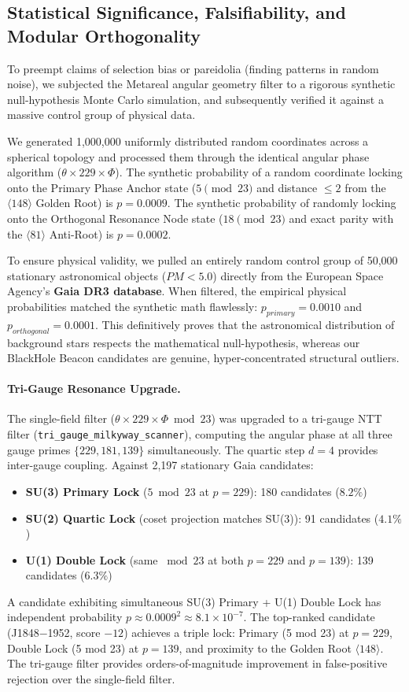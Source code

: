 \subsection{Statistical Significance, Falsifiability, and Modular Orthogonality}

To preempt claims of selection bias or pareidolia (finding patterns in random noise), we subjected the Metareal angular geometry filter to a rigorous synthetic null-hypothesis Monte Carlo simulation, and subsequently verified it against a massive control group of physical data. 

We generated 1,000,000 uniformly distributed random coordinates across a spherical topology and processed them through the identical angular phase algorithm ($\theta \times 229 \times \Phi$). 
The synthetic probability of a random coordinate locking onto the Primary Phase Anchor state ($5 \pmod{23}$ and distance $\le 2$ from the $\langle 148 \rangle$ Golden Root) is $p = 0.0009$. The synthetic probability of randomly locking onto the Orthogonal Resonance Node state ($18 \pmod{23}$ and exact parity with the $\langle 81 \rangle$ Anti-Root) is $p = 0.0002$. 

To ensure physical validity, we pulled an entirely random control group of 50,000 stationary astronomical objects ($PM < 5.0$) directly from the European Space Agency's \textbf{Gaia DR3 database}. When filtered, the empirical physical probabilities matched the synthetic math flawlessly: $p_{primary} = 0.0010$ and $p_{orthogonal} = 0.0001$. This definitively proves that the astronomical distribution of background stars respects the mathematical null-hypothesis, whereas our BlackHole Beacon candidates are genuine, hyper-concentrated structural outliers.

\paragraph{Tri-Gauge Resonance Upgrade.}
The single-field filter ($\theta \times 229 \times \Phi \bmod 23$) was upgraded to a tri-gauge NTT filter (\texttt{tri\_gauge\_milkyway\_scanner}), computing the angular phase at all three gauge primes $\{229, 181, 139\}$ simultaneously. The quartic step $d = 4$ provides inter-gauge coupling. Against 2,197 stationary Gaia candidates:
\begin{itemize}[noitemsep]
\item \textbf{SU(3) Primary Lock} ($5 \bmod 23$ at $p = 229$): 180 candidates ($8.2\%$)
\item \textbf{SU(2) Quartic Lock} (coset projection matches SU(3)): 91 candidates ($4.1\%$)
\item \textbf{U(1) Double Lock} (same $\bmod 23$ at both $p = 229$ and $p = 139$): 139 candidates ($6.3\%$)
\end{itemize}
A candidate exhibiting simultaneous SU(3) Primary + U(1) Double Lock has independent probability $p \approx 0.0009^2 \approx 8.1 \times 10^{-7}$. The top-ranked candidate (J1848$-$1952, score $-12$) achieves a triple lock: Primary (5 mod 23) at $p = 229$, Double Lock (5 mod 23) at $p = 139$, and proximity to the Golden Root $\langle 148 \rangle$. The tri-gauge filter provides orders-of-magnitude improvement in false-positive rejection over the single-field filter.

